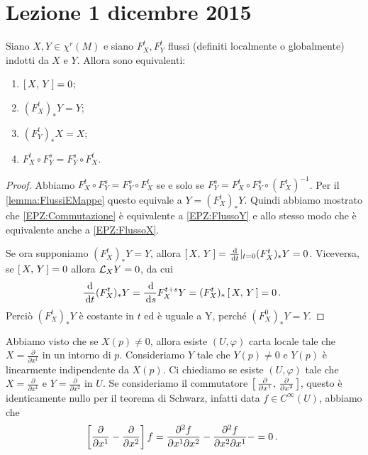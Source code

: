 \chapter{Lezione 1 dicembre 2015}

\begin{proposition} \label{prop:EquivalenzaParentesiZero}
	Siano $X,Y\in\chi^r(M)$ e siano $F_X^t,F_Y^t$ flussi (definiti localmente o globalmente) indotti da $X$ e $Y$. Allora sono equivalenti:
	\begin{enumerate}
	\item $\left[\,X,\,Y\,\right]=0$; \label{EPZ:ParentesiZero}
	\item $(F_X^t)_*Y=Y$; \label{EPZ:FlussoY}
	\item $(F_Y^t)_*X=X$; \label{EPZ:FlussoX}
	\item $F_X^t\circ F_Y^s=F_Y^s\circ F_X^t$. \label{EPZ:Commutazione}
	\end{enumerate}
\end{proposition}

\begin{proof}
	Abbiamo $F_X^t\circ F_Y^s=F_Y^s\circ F_X^t$ se e solo se $F_Y^s=F_X^t\circ F_Y^s\circ (F_X^t)^{-1}$. Per il \cref{lemma:FlussiEMappe} questo equivale a $Y=(F_X^t)_*Y$. Quindi abbiamo mostrato che \ref{EPZ:Commutazione} è equivalente a \ref{EPZ:FlussoY} e allo stesso modo che è equivalente anche a \ref{EPZ:FlussoX}.
	
	Se ora supponiamo $(F_X^t)_*Y=Y$, allora $\left[\,X,\,Y\,\right]=\frac{\,\mathrm d}{\,\mathrm d t}|_{t=0}(F_X^t)_*Y=0$. Viceversa, se $\left[\,X,\,Y\,\right]=0$ allora $\mathcal L_XY=0$, da cui
	\begin{equation*}
		\frac{\,\mathrm d}{\,\mathrm d t}(F_X^t)_*Y=\frac{\,\mathrm d}{\,\mathrm d s}F_X^{t+s}Y=(F_X^t)_*\left[\,X,\,Y\,\right]=0\, \text{. }
	\end{equation*}
	Perciò  $(F_X^t)_*Y$ è costante in $t$ ed è uguale a Y, perché $(F_X^0)_*Y=Y$.
\end{proof}

Abbiamo visto che se $X(p)\ne 0$, allora esiste $(U,\varphi)$ carta locale tale che $X=\frac{\partial}{\partial x^1}$ in un intorno di $p$. Consideriamo $Y$ tale che $Y(p)\neq 0$ e $Y(p)$ è linearmente indipendente da $X(p)$. Ci chiediamo se esiste $(U,\varphi)$ tale che $X=\frac{\partial}{\partial x^1}$ e $Y=\frac{\partial}{\partial x^2}$ in $U$. Se consideriamo il commutatore $\left[\,\frac{\partial}{\partial x^1},\,\frac{\partial}{\partial x^2}\,\right]$, questo è identicamente nullo per il teorema di Schwarz, infatti data $f\in C^\infty(U)$, abbiamo che
\begin{equation*}
	\left[\frac{\partial}{\partial x^1}-\frac{\partial}{\partial x^2}\right]f=\frac{\partial^2f}{\partial x^1\partial x^2}-\frac{\partial^2f}{\partial x^2\partial x^1}-=0\, \text{. }
\end{equation*}

